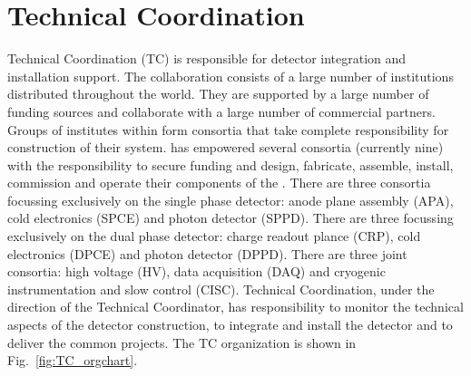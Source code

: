 \chapter{Technical Coordination}
\label{ch:fdsp-coord}

Technical Coordination (TC) is responsible for detector integration
and installation support. 
The  collaboration consists of a large number of
institutions distributed throughout the world. They are supported by a
large number of funding sources and collaborate with a large number of
commercial partners. Groups of institutes within  form
consortia that take complete responsibility for construction of their
system.   has empowered several consortia (currently nine)
with the responsibility to secure funding and design, fabricate,
assemble, install, commission and operate their components of the
 . There are three consortia focussing
exclusively on the single phase detector: anode plane assembly (APA),
cold electronics (SPCE) and photon detector (SPPD). There are three
focussing exclusively on the dual phase detector: charge readout
plance (CRP), cold electronics (DPCE) and photon detector
(DPPD). There are three joint consortia: high voltage (HV), data
acquisition (DAQ) and cryogenic instrumentation and slow control
(CISC).   Technical Coordination, under the direction of
the  Technical Coordinator, has responsibility to
monitor the technical aspects of the detector construction, to
integrate and install the detector and to deliver the common projects. The
 TC organization is shown in Fig.~\ref{fig:TC_orgchart}.
